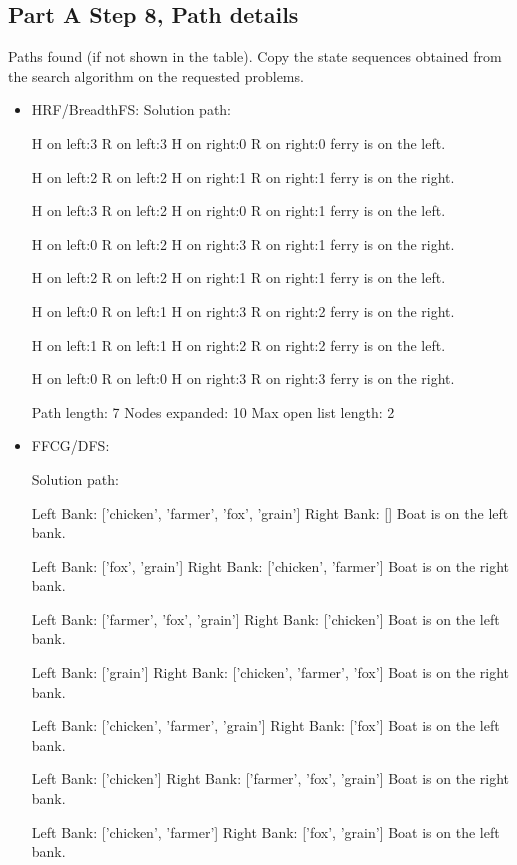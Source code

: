 \documentclass{article}
\begin{document}
\subsection{Part A Step 8, Path details}
 Paths found (if not shown in the table).  Copy the state sequences
 obtained from the search algorithm on the requested problems.

 \begin{itemize}
 \item HRF/BreadthFS:
 Solution path:

 H on left:3
 R on left:3
   H on right:0
   R on right:0
 ferry is on the left.


 H on left:2
 R on left:2
   H on right:1
   R on right:1
 ferry is on the right.


 H on left:3
 R on left:2
   H on right:0
   R on right:1
 ferry is on the left.


 H on left:0
 R on left:2
   H on right:3
   R on right:1
 ferry is on the right.


 H on left:2
 R on left:2
   H on right:1
   R on right:1
 ferry is on the left.


 H on left:0
 R on left:1
   H on right:3
   R on right:2
 ferry is on the right.


 H on left:1
 R on left:1
   H on right:2
   R on right:2
 ferry is on the left.


 H on left:0
 R on left:0
   H on right:3
   R on right:3
 ferry is on the right.

Path length: 7
Nodes expanded: 10
Max open list length: 2

 \item FFCG/DFS: 

 Solution path:

Left Bank: ['chicken', 'farmer', 'fox', 'grain']
Right Bank: []
Boat is on the left bank.

Left Bank: ['fox', 'grain']
Right Bank: ['chicken', 'farmer']
Boat is on the right bank.

Left Bank: ['farmer', 'fox', 'grain']
Right Bank: ['chicken']
Boat is on the left bank.

Left Bank: ['grain']
Right Bank: ['chicken', 'farmer', 'fox']
Boat is on the right bank.

Left Bank: ['chicken', 'farmer', 'grain']
Right Bank: ['fox']
Boat is on the left bank.

Left Bank: ['chicken']
Right Bank: ['farmer', 'fox', 'grain']
Boat is on the right bank.

Left Bank: ['chicken', 'farmer']
Right Bank: ['fox', 'grain']
Boat is on the left bank.


\end{itemize}
\end{document}
